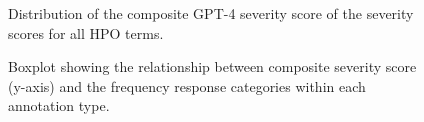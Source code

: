 \documentclass[
]{agujournal2019}
\begin{document}
\label{cell-fig-severity-histo}
\begin{figure}[H]


\caption{\label{fig-severity-histo}Distribution of the composite GPT-4
severity score of the severity scores for all HPO terms.}

\end{figure}%

\label{cell-fig-severity-boxplot}
\begin{figure}[H]


\caption{\label{fig-severity-boxplot}Boxplot showing the relationship
between composite severity score (y-axis) and the frequency response
categories within each annotation type.}

\end{figure}%
\end{document}
